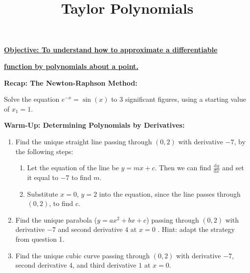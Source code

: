 \documentclass{article}
\newcommand{\deriv}[3][]{\frac{\mathrm{d}^{#1} #2}{\mathrm{d}#3^{#1}}}
\begin{document}
\title{Taylor Polynomials}
\date{}

\maketitle
\thispagestyle{empty}

\Large

\textbf{\underline{Objective: To understand how to approximate a differentiable}}

\textbf{\underline{function by polynomials about a point.}}




\vspace{5mm}


\textbf{Recap: The Newton-Raphson Method:}

\vspace{5mm}


Solve the equation $e^{-x}=\sin(x)$ to 3 significant figures, using a starting value of $x_1=1$.

\bigskip




\clearpage


{\bf Warm-Up: Determining Polynomials by Derivatives:}

\vspace{5mm}

\begin{enumerate}
	\item Find the unique straight line passing through $(0,2)$ with derivative $-7$, by the following steps:
		\begin{enumerate}
			\item Let the equation of the line be $y=mx+c$. Then we can find $\deriv{y}{x}$ and set it equal to $-7$ to find $m$.
			\item Substitute $x=0$, $y=2$ into the equation, since the line passes through $(0,2)$, to find $c$.
		\end{enumerate}
	\item Find the unique parabola ($y=ax^2+bx+c$) passing through $(0,2)$ with derivative $-7$ and second derivative $4$ at $x=0$ . Hint: adapt the strategy from question 1.
	\item Find the unique cubic curve passing through $(0,2)$ with derivative $-7$, second derivative $4$, and third derivative $1$ at $x=0$.
\end{enumerate}
\end{document}
